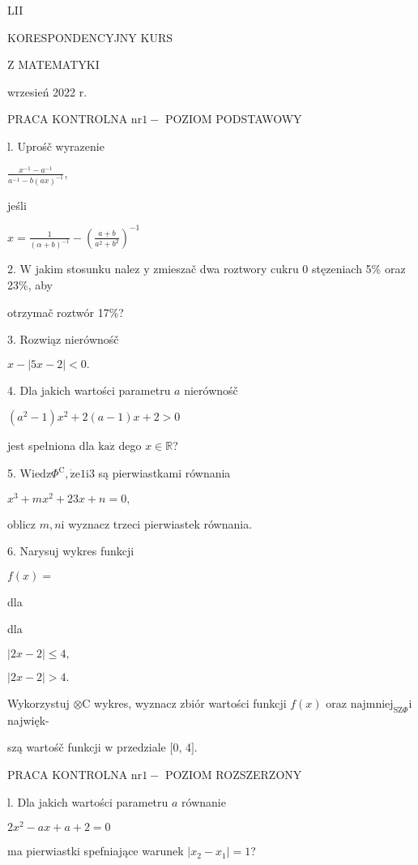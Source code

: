 \documentclass[a4paper,12pt]{article}
\begin{document}
LII

KORESPONDENCYJNY KURS

Z MATEMATYKI

wrzesień 2022 r.

PRACA KONTROLNA $\mathrm{n}\mathrm{r} 1-$ POZIOM PODSTAWOWY

l. Uprośč wyrazenie

$\displaystyle \frac{x^{-1}-a^{-1}}{a^{-1}-b(ax)^{-1}},$

jeśli

$x=\displaystyle \frac{1}{(\alpha+b)^{-1}}- (\displaystyle \frac{a+b}{a^{2}+b^{2}})^{-1}$

2. $\mathrm{W}$ jakim stosunku nalez $\mathrm{y}$ zmieszač dwa roztwory cukru $0$ stęzeniach 5\% oraz 23\%, aby

otrzymač roztwór 17\%?

3. Rozwiąz nierównośč

$x-|5x-2|<0.$

4. Dla jakich wartości parametru $a$ nierównośč

$(a^{2}-1)x^{2}+2(a-1)x+2>0$

jest spełniona dla $\mathrm{k}\mathrm{a}\dot{\mathrm{z}}$ dego $x\in \mathbb{R}$?

5. $\mathrm{W}\mathrm{i}\mathrm{e}\mathrm{d}\mathrm{z}\Phi^{\mathrm{C}}, \dot{\mathrm{z}}\mathrm{e}1\mathrm{i}3$ są pierwiastkami równania

$x^{3}+mx^{2}+23x+n=0,$

oblicz $m, n\mathrm{i}$ wyznacz trzeci pierwiastek równania.

6. Narysuj wykres funkcji

$f(x)=$

dla

dla

$|2x-2|\leq 4,$

$|2x-2|>4.$

Wykorzystuj $\otimes \mathrm{C}$ wykres, wyznacz zbiór wartości funkcji $f(x)$ oraz $\mathrm{n}\mathrm{a}\mathrm{j}\mathrm{m}\mathrm{n}\mathrm{i}\mathrm{e}\mathrm{j}_{\mathrm{S}\mathrm{Z}\Phi}\mathrm{i}$ najwięk-

szą wartośč funkcji $\mathrm{w}$ przedziale $[0$, 4$].$




PRACA KONTROLNA $\mathrm{n}\mathrm{r} 1 -$ POZIOM ROZSZERZONY

l. Dla jakich wartości parametru $a$ równanie

$2x^{2}-ax+a+2=0$

ma pierwiastki spefniające warunek $|x_{2}-x_{1}|=1$?
\end{document}
